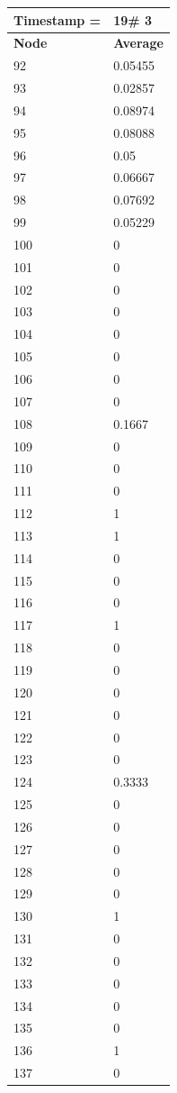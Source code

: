 \begin{tabular}{|l||l|}
\hline
\textbf{Timestamp =} & \textbf{19}\# 3\\\hline
	\textbf{Node} & \textbf{Average} \\ \hline
\hline
	92 & 0.05455 \\ \hline
	93 & 0.02857 \\ \hline
	94 & 0.08974 \\ \hline
	95 & 0.08088 \\ \hline
	96 & 0.05 \\ \hline
	97 & 0.06667 \\ \hline
	98 & 0.07692 \\ \hline
	99 & 0.05229 \\ \hline
	100 & 0 \\ \hline
	101 & 0 \\ \hline
	102 & 0 \\ \hline
	103 & 0 \\ \hline
	104 & 0 \\ \hline
	105 & 0 \\ \hline
	106 & 0 \\ \hline
	107 & 0 \\ \hline
	108 & 0.1667 \\ \hline
	109 & 0 \\ \hline
	110 & 0 \\ \hline
	111 & 0 \\ \hline
	112 & 1 \\ \hline
	113 & 1 \\ \hline
	114 & 0 \\ \hline
	115 & 0 \\ \hline
	116 & 0 \\ \hline
	117 & 1 \\ \hline
	118 & 0 \\ \hline
	119 & 0 \\ \hline
	120 & 0 \\ \hline
	121 & 0 \\ \hline
	122 & 0 \\ \hline
	123 & 0 \\ \hline
	124 & 0.3333 \\ \hline
	125 & 0 \\ \hline
	126 & 0 \\ \hline
	127 & 0 \\ \hline
	128 & 0 \\ \hline
	129 & 0 \\ \hline
	130 & 1 \\ \hline
	131 & 0 \\ \hline
	132 & 0 \\ \hline
	133 & 0 \\ \hline
	134 & 0 \\ \hline
	135 & 0 \\ \hline
	136 & 1 \\ \hline
	137 & 0 \\ \hline
\end{tabular}

